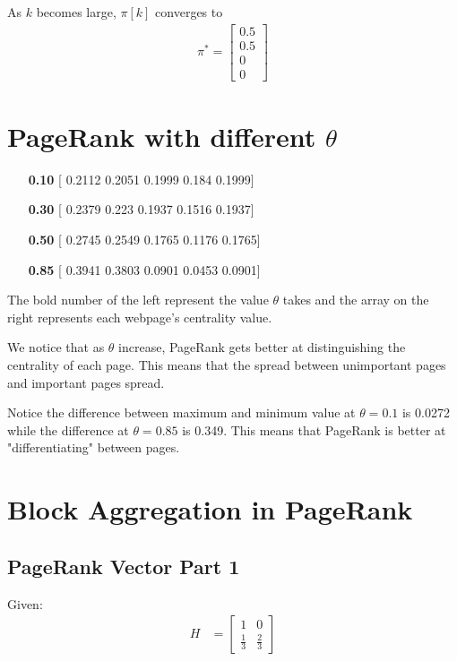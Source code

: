 \documentclass[]{article}
\begin{document}
As $k$ becomes large, $\pi[k]$ converges to 
\begin{gather*}
	\pi^* = 
	\begin{bmatrix}
		0.5 \\
		0.5 \\
		0 \\
		0
	\end{bmatrix}
\end{gather*}


\newpage
\section{PageRank with different $\theta$}

\begin{enumerate}
	\item[\textbf{0.10}] [ 0.2112  0.2051  0.1999  0.184   0.1999]
	\item[\textbf{0.30}] [ 0.2379  0.223   0.1937  0.1516  0.1937]
	\item[\textbf{0.50}] [ 0.2745  0.2549  0.1765  0.1176  0.1765]
	\item[\textbf{0.85}] [ 0.3941  0.3803  0.0901  0.0453  0.0901]
\end{enumerate}

The bold number of the left represent the value $\theta$ takes and the array on the right represents each webpage's centrality value.

We notice that as $\theta$ increase, PageRank gets better at distinguishing the centrality of each page. This means that the spread between unimportant pages and important pages spread.

Notice the difference between maximum and minimum value at $\theta=0.1$ is 0.0272 while the difference at $\theta=0.85$ is 0.349. This means that PageRank is better at "differentiating" between pages.


\newpage
\section{Block Aggregation in PageRank}

\subsection{PageRank Vector Part 1}

Given:
\begin{align*}
	H &= \begin{bmatrix}
	1 & 0 \\
	\frac{1}{3} & \frac{2}{3}
	\end{bmatrix} \\
\end{align*}
\end{document}
